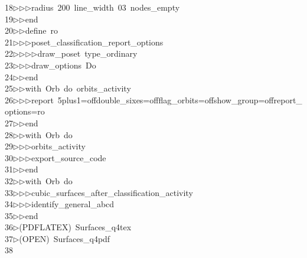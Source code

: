\begin{tabbing}
18\>$\triangleright$\>$\triangleright$\>$\triangleright$\>radius\ 200\ line\_width\ 03\ nodes\_empty\ \\[0pt]
19\>$\triangleright$\>$\triangleright$\>end\ \\[0pt]
20\>$\triangleright$\>$\triangleright$\>define\ ro\ \\[0pt]
21\>$\triangleright$\>$\triangleright$\>$\triangleright$\>poset\_classification\_report\_options\ \\[0pt]
22\>$\triangleright$\>$\triangleright$\>$\triangleright$\>$\triangleright$\>draw\_poset\ type\_ordinary\ \\[0pt]
23\>$\triangleright$\>$\triangleright$\>$\triangleright$\>draw\_options\ Do\ \\[0pt]
24\>$\triangleright$\>$\triangleright$\>end\ \\[0pt]
25\>$\triangleright$\>$\triangleright$\>with\ Orb\ do\ orbits\_activity\ \\[0pt]
26\>$\triangleright$\>$\triangleright$\>$\triangleright$\>report\ 5plus1=offdouble\_sixes=offflag\_orbits=offshow\_group=offreport\_\\[0pt]
\>options=ro\ \\[0pt]
27\>$\triangleright$\>$\triangleright$\>end\ \\[0pt]
28\>$\triangleright$\>$\triangleright$\>with\ Orb\ do\ \\[0pt]
29\>$\triangleright$\>$\triangleright$\>$\triangleright$\>orbits\_activity\ \\[0pt]
30\>$\triangleright$\>$\triangleright$\>$\triangleright$\>export\_source\_code\ \\[0pt]
31\>$\triangleright$\>$\triangleright$\>end\ \\[0pt]
32\>$\triangleright$\>$\triangleright$\>with\ Orb\ do\ \\[0pt]
33\>$\triangleright$\>$\triangleright$\>$\triangleright$\>cubic\_surfaces\_after\_classification\_activity\ \\[0pt]
34\>$\triangleright$\>$\triangleright$\>$\triangleright$\>identify\_general\_abcd\ \\[0pt]
35\>$\triangleright$\>$\triangleright$\>end\\[0pt]
36\>$\triangleright$\>(PDFLATEX)\ Surfaces\_q4tex\ \\[0pt]
37\>$\triangleright$\>(OPEN)\ Surfaces\_q4pdf\\[0pt]
38\>\end{tabbing}
